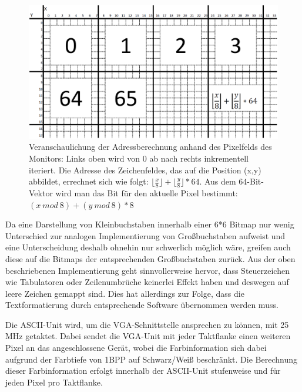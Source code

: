 \begin{figure}[H]
	\centering
		\includegraphics[width=1.0\textwidth]{Bildschirm.png}
	\caption[Veranschaulichung der Adressberechnung der ASCII-Unit]{Veranschaulichung der Adressberechnung anhand des Pixelfelds des Monitors: Links oben wird von 0 ab nach rechts inkrementell iteriert. Die Adresse des Zeichenfeldes, das auf die Position (x,y) abbildet, errechnet sich wie folgt: $\lfloor \frac{x}{8} \rfloor + \lfloor \frac{y}{8} \rfloor * 64$. Aus dem 64-Bit-Vektor wird man das Bit f\"ur den aktuelle Pixel bestimmt: $(x\:  mod\:  8) + (y\:  mod\:  8) * 8$}
\end{figure}

Da eine Darstellung von Kleinbuchstaben innerhalb einer 6*6 Bitmap nur wenig Unterschied zur analogen Implementierung von Gro\ss{}buchstaben aufweist und eine Unterscheidung deshalb ohnehin nur schwerlich m\"oglich w\"are, greifen auch diese auf die Bitmaps der entsprechenden Gro\ss{}buchstaben zur\"uck. Aus der oben beschriebenen Implementierung geht sinnvollerweise hervor, dass Steuerzeichen wie Tabulatoren oder Zeilenumbr\"uche keinerlei Effekt haben und deswegen auf leere Zeichen gemappt sind. Dies hat allerdings zur Folge, dass die Textformatierung durch entsprechende Software \"ubernommen werden muss.

Die ASCII-Unit wird, um die VGA-Schnittstelle ansprechen zu k\"onnen, mit 25 MHz getaktet. Dabei sendet die VGA-Unit mit jeder Taktflanke einen weiteren Pixel an das angeschlossene Ger\"at, wobei die Farbinformation sich dabei aufgrund der Farbtiefe von 1BPP auf Schwarz/Wei\ss{} beschr\"ankt. Die Berechnung dieser Farbinformation erfolgt innerhalb der ASCII-Unit stufenweise und f\"ur jeden Pixel pro Taktflanke. 

